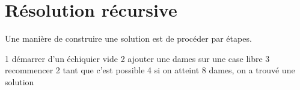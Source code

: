 \section*{Résolution récursive}

Une manière de construire une solution est de procéder par étapes.

1 démarrer d'un échiquier vide
2 ajouter une dames sur une case libre
3 recommencer 2 tant que c'est possible
4 si on atteint 8 dames, on a trouvé une solution



